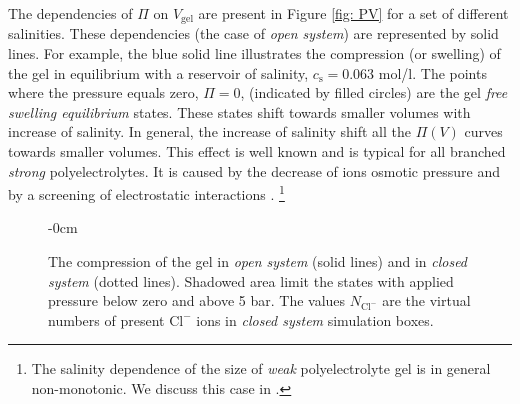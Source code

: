 \documentclass[journal,article,submit,pdftex,moreauthors]{Definitions/mdpi}
\newcommand{\ncl}{n_\mathrm{Cl^-}}
\newcommand{\cl}{\mathrm{Cl^-}}
\newcommand{\cs}{c_{\mathrm{s}}}
\newcommand{\Vgel}{V_\mathrm{gel}}
\newcommand{\Pgel}{\Pi}
\begin{document}
The dependencies of $\Pgel$ on $\Vgel$ are present in Figure \ref{fig: PV} for a set of different salinities. 
These dependencies (the case of \emph{open system}) are represented by solid lines. 
For example, the blue solid line illustrates the compression (or swelling) of the gel in equilibrium with a reservoir of salinity, $\cs=0.063$ mol/l. 
The points where the pressure equals zero, $\Pgel=0$, (indicated by filled circles) are the gel \emph{free swelling equilibrium} states. 
These states shift towards smaller volumes with increase of salinity. 
In general, the increase of salinity shift all the $\Pgel(V)$ curves towards smaller volumes.
This effect is well known and is typical for all branched \emph{strong} polyelectrolytes. 
It is caused by the decrease of ions osmotic pressure and by a screening of electrostatic interactions \cite{Zhulina2000, Landsgesel2020a}.
\footnote{The salinity dependence of the size of \emph{weak} polyelectrolyte gel is in general non-monotonic. We discuss this case in \cite{Rud2018}.}

\begin{figure}[h]
\begin{adjustwidth}{-\extralength}{0cm}
\hspace{0.02\textwidth}
\caption{The compression of the gel in \emph{open system} (solid lines) and in \emph{closed system} (dotted lines). 
Shadowed area limit the states with applied pressure below zero and above 5 bar.
The values $N_\cl$ are the virtual numbers of present $\cl$ ions in \emph{closed system} simulation boxes.
\label{fig: NV and CN}}
\end{adjustwidth}
\end{figure}
\end{document}
